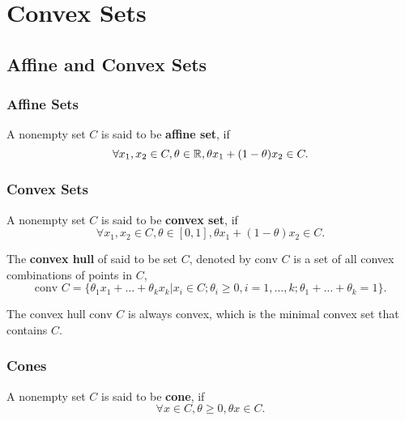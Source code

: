\chapter{Convex Sets}

\section{Affine and Convex Sets}

\subsection{Affine Sets}

\begin{definition}
	A nonempty set $C$ is said to be \textbf{affine set}, if $$\forall x_1,x_2\in C, \theta\in{\mathbb R}, \theta x_1+(1-\theta)x_2\in C.$$
\end{definition}

\subsection{Convex Sets}

\begin{definition}
	A nonempty set $C$ is said to be \textbf{convex set}, if $$\forall x_1,x_2\in C,\theta\in[0,1], \theta x_1+(1-\theta)x_2\in C.$$
\end{definition}

\begin{definition}
	The \textbf{convex hull} of said to be set $C$, denoted by $\text{conv } C$ is a set of all convex combinations of points in $C$, $$\text{conv } C=\{\theta_1x_1+\ldots+\theta_kx_k|x_i\in C;\theta_i\geq 0,i=1,\ldots,k;\theta_1+\ldots+\theta_k=1\}.$$
\end{definition}

\begin{remark}
	The convex hull $\text{conv } C$ is always convex, which is the minimal convex set that contains $C$.
\end{remark}

\subsection{Cones}

\begin{definition}[Cone]
	A nonempty set $C$ is said to be \textbf{cone}, if $$\forall x\in C,\theta\geq 0,\theta x\in C.$$
\end{definition}

